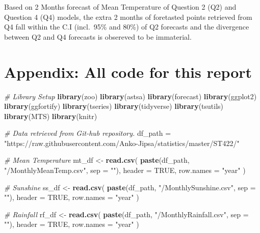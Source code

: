 \documentclass[
  11pt,
]{article}
\newenvironment{Shaded}{\begin{snugshade}}{\end{snugshade}}
\newcommand{\CommentTok}[1]{\textcolor[rgb]{0.56,0.35,0.01}{\textit{#1}}}
\newcommand{\DataTypeTok}[1]{\textcolor[rgb]{0.13,0.29,0.53}{#1}}
\newcommand{\KeywordTok}[1]{\textcolor[rgb]{0.13,0.29,0.53}{\textbf{#1}}}
\newcommand{\NormalTok}[1]{#1}
\newcommand{\OtherTok}[1]{\textcolor[rgb]{0.56,0.35,0.01}{#1}}
\newcommand{\StringTok}[1]{\textcolor[rgb]{0.31,0.60,0.02}{#1}}
\begin{document}
Based on 2 Months forecast of Mean Temperature of Question 2 (Q2) and
Question 4 (Q4) models, the extra 2 months of foretasted points
retrieved from Q4 fall within the C.I (incl.~95\% and 80\%) of Q2
forecasts and the divergence between Q2 and Q4 forecasts is obsereved to
be immaterial.

\newpage
\newpage

\hypertarget{appendix-all-code-for-this-report}{%
\section{Appendix: All code for this
report}\label{appendix-all-code-for-this-report}}

\begin{Shaded}
\begin{Highlighting}[]
\CommentTok{# Library Setup}
\KeywordTok{library}\NormalTok{(zoo)}
\KeywordTok{library}\NormalTok{(astsa)}
\KeywordTok{library}\NormalTok{(forecast)}
\KeywordTok{library}\NormalTok{(ggplot2)}
\KeywordTok{library}\NormalTok{(ggfortify)}
\KeywordTok{library}\NormalTok{(tseries)}
\KeywordTok{library}\NormalTok{(tidyverse)}
\KeywordTok{library}\NormalTok{(tsutils)}
\KeywordTok{library}\NormalTok{(MTS)}
\KeywordTok{library}\NormalTok{(knitr)}

\CommentTok{# Data retrieved from Git-hub repository.}
\NormalTok{df_path =}\StringTok{ "https://raw.githubusercontent.com/Anko-Jipsa/statistics/master/ST422/"}

\CommentTok{# Mean Temperature}
\NormalTok{mt_df <-}\StringTok{ }\KeywordTok{read.csv}\NormalTok{(}
  \KeywordTok{paste}\NormalTok{(df_path, }\StringTok{"/MonthlyMeanTemp.csv"}\NormalTok{, }\DataTypeTok{sep =} \StringTok{""}\NormalTok{),}
  \DataTypeTok{header =} \OtherTok{TRUE}\NormalTok{,}
  \DataTypeTok{row.names =} \StringTok{"year"}
\NormalTok{)}

\CommentTok{# Sunshine}
\NormalTok{ss_df <-}\StringTok{ }\KeywordTok{read.csv}\NormalTok{(}
  \KeywordTok{paste}\NormalTok{(df_path, }\StringTok{"/MonthlySunshine.csv"}\NormalTok{, }\DataTypeTok{sep =} \StringTok{""}\NormalTok{),}
  \DataTypeTok{header =} \OtherTok{TRUE}\NormalTok{,}
  \DataTypeTok{row.names =} \StringTok{"year"}
\NormalTok{)}

\CommentTok{# Rainfall}
\NormalTok{rf_df <-}\StringTok{ }\KeywordTok{read.csv}\NormalTok{(}
  \KeywordTok{paste}\NormalTok{(df_path, }\StringTok{"/MonthlyRainfall.csv"}\NormalTok{, }\DataTypeTok{sep =} \StringTok{""}\NormalTok{),}
  \DataTypeTok{header =} \OtherTok{TRUE}\NormalTok{,}
  \DataTypeTok{row.names =} \StringTok{"year"}
\NormalTok{)}


\end{Highlighting}
\end{Shaded}
\end{document}
